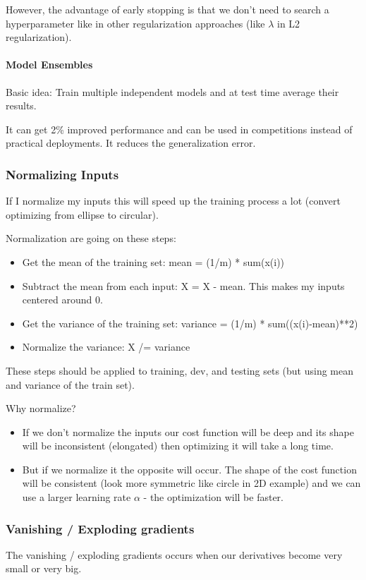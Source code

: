 However, the advantage of early stopping is that we don't need to search a hyperparameter like in other regularization approaches (like $\lambda$ in L2 regularization).

\paragraph{Model Ensembles}
Basic idea: Train multiple independent models and at test time average their results.

It can get 2\% improved performance and can be used in competitions instead of practical deployments. It reduces the generalization error. 

\subsubsection{Normalizing Inputs}
If I normalize my inputs this will speed up the training process a lot (convert optimizing from ellipse to circular).

Normalization are going on these steps:

\begin{itemize}
    \item Get the mean of the training set: mean = (1/m) * sum(x(i))
    \item Subtract the mean from each input: X = X - mean. This makes my inputs centered around 0.
    \item Get the variance of the training set: variance = (1/m) * sum((x(i)-mean)**2)
    \item Normalize the variance: X /= variance
\end{itemize}

These steps should be applied to training, dev, and testing sets (but using mean and variance of the train set).

Why normalize?
\begin{itemize}
    \item If we don't normalize the inputs our cost function will be deep and its shape will be inconsistent (elongated) then optimizing it will take a long time.
    \item But if we normalize it the opposite will occur. The shape of the cost function will be consistent (look more symmetric like circle in 2D example) and we can use a larger learning rate $\alpha$ - the optimization will be faster.
\end{itemize}


\subsubsection{Vanishing / Exploding gradients}
The vanishing / exploding gradients occurs when our derivatives become very small or very big.

